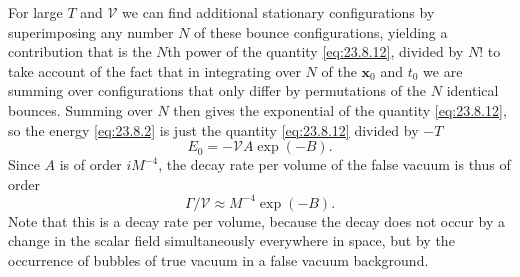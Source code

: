 For large $T$ and $\mathcal V$ we can find additional stationary configurations by superimposing any number $N$ of these bounce configurations, yielding a contribution that is the $N$th power of the quantity \eqref{eq:23.8.12}, divided by $N!$ to take account of the fact that in integrating over $N$ of the $\mathbf x_0$ and $t_0$ we are summing over configurations that only differ by permutations of the $N$ identical bounces. Summing over $N$ then gives the exponential of the quantity \eqref{eq:23.8.12}, so the energy \eqref{eq:23.8.2} is just the quantity \eqref{eq:23.8.12} divided by $-T$
\begin{equation}
 E_0=-\mathcal VA\exp(-B).
 \tag{23.8.13}\label{eq:23.8.13}
\end{equation}
Since $A$ is of order $iM^{-4}$, the decay rate per volume of the false vacuum is thus of order
\begin{equation}
 \Gamma/\mathcal V\approx M^{-4}\exp(-B).
 \tag{23.8.14}\label{eq:23.8.14}
\end{equation}
Note that this is a decay rate per volume, because the decay does not occur by a change in the scalar field simultaneously everywhere in space, but by the occurrence of bubbles of true vacuum in a false vacuum background.

